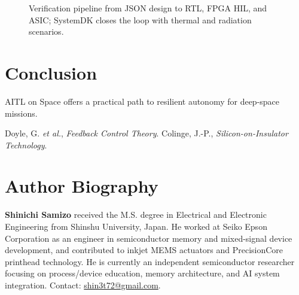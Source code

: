 \documentclass[conference]{IEEEtran}
\begin{document}
\begin{figure}[!t]
  \centering
  \caption{Verification pipeline from JSON design to RTL, FPGA HIL, and ASIC; SystemDK closes the loop with thermal and radiation scenarios.}
  \label{fig:pipeline}
\end{figure}

\section{Conclusion}
AITL on Space offers a practical path to resilient autonomy for deep-space missions.


\begin{thebibliography}{9}
 Doyle, G. \emph{et al.}, \emph{Feedback Control Theory}.
 Colinge, J.-P., \emph{Silicon-on-Insulator Technology}.
\end{thebibliography}

\section*{Author Biography}
\textbf{Shinichi Samizo} received the M.S. degree in Electrical and Electronic Engineering from Shinshu University, Japan. He worked at Seiko Epson Corporation as an engineer in semiconductor memory and mixed-signal device development, and contributed to inkjet MEMS actuators and PrecisionCore printhead technology. He is currently an independent semiconductor researcher focusing on process/device education, memory architecture, and AI system integration. Contact: \href{mailto:shin3t72@gmail.com}{shin3t72@gmail.com}.
\end{document}
